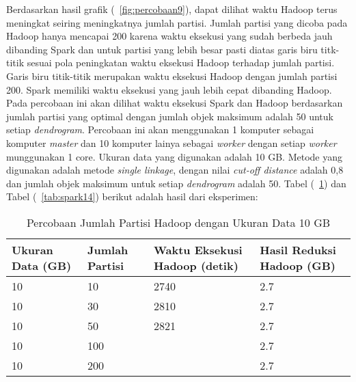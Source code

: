 Berdasarkan hasil grafik (~\ref{fig:percobaan9}), dapat dilihat waktu Hadoop terus meningkat seiring meningkatnya jumlah partisi. Jumlah partisi yang dicoba pada Hadoop hanya mencapai 200 karena waktu eksekusi yang sudah berbeda jauh dibanding Spark dan untuk partisi yang lebih besar pasti diatas garis biru titk-titik sesuai pola peningkatan waktu eksekusi Hadoop terhadap jumlah partisi. Garis biru titik-titik merupakan waktu eksekusi Hadoop dengan jumlah partisi 200. Spark memiliki waktu eksekusi yang jauh lebih cepat dibanding Hadoop.\\  



Pada percobaan ini akan dilihat waktu eksekusi Spark dan Hadoop berdasarkan jumlah partisi yang optimal dengan jumlah objek maksimum adalah 50 untuk setiap \textit{dendrogram}. Percobaan ini akan menggunakan 1 komputer sebagai komputer \textit{master} dan 10 komputer lainya sebagai \textit{worker} dengan setiap \textit{worker} munggunakan 1 core. Ukuran data yang digunakan adalah 10 GB. Metode yang digunakan adalah metode \textit{single linkage}, dengan nilai \textit{cut-off distance} adalah 0,8 dan jumlah objek maksimum untuk setiap \textit{dendrogram} adalah 50. Tabel (~\ref{tab:spark13}) dan Tabel (~\ref{tab:spark14}) berikut adalah hasil dari eksperimen:





\begin{table}[H] 
	\centering 
	\caption{Percobaan Jumlah Partisi Hadoop dengan Ukuran Data 10 GB}
	\label{tab:spark13}
	\begin{tabular}{|p{3cm}|p{3cm}|p{4cm}|p{4cm}|}
\hline
Ukuran Data (GB) & Jumlah Partisi &  Waktu Eksekusi Hadoop (detik) & Hasil Reduksi Hadoop (GB)\\
\hline
10 & 10 & 2740  & 2.7  \\
\hline
10 & 30 & 2810  & 2.7  \\
\hline
10 & 50 & 2821  & 2.7   \\
\hline
10 & 100 &   & 2.7   \\
\hline
10 & 200 &   & 2.7   \\
\hline


\hline

	\end{tabular} 
\end{table}




